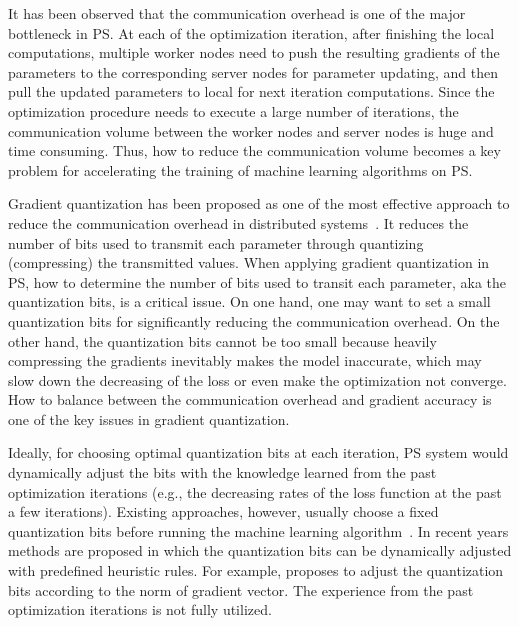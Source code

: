 \documentclass[sigconf]{acmart}
\begin{document}
It has been observed that the communication overhead is one of the major bottleneck in PS\cite{dean2012large,ho2013more}. At each of the optimization iteration, after finishing the local computations, multiple worker nodes need to push the resulting gradients of the parameters to the corresponding server nodes for parameter updating, and then pull the updated parameters to local for next iteration computations. Since the optimization procedure needs to execute a large number of iterations, the communication volume between the worker nodes and server nodes is huge and time consuming. Thus, how to reduce the communication volume becomes a key problem for accelerating the training of machine learning algorithms on PS.


Gradient quantization has been proposed as one of the most effective approach to reduce the communication overhead in distributed systems~\cite{oland2015reducing,seide20141,alistarh2016qsgd}. It reduces the number of bits used to transmit each parameter through quantizing (compressing) the transmitted values. When applying gradient quantization in PS, how to determine the number of bits used to transit each parameter, aka the quantization bits, is a critical issue. On one hand, one may want to set a small quantization bits for significantly reducing the communication overhead. On the other hand, the quantization bits cannot be too small because heavily compressing the gradients inevitably makes the model inaccurate, which may slow down the decreasing of the loss or even make the optimization not converge. How to balance between the communication overhead and gradient accuracy is one of the key issues in gradient quantization.

Ideally, for choosing optimal quantization bits at each iteration,  PS system would dynamically adjust the bits with the knowledge learned from the past optimization iterations (e.g., the decreasing rates of the loss function at the past a few iterations). Existing approaches, however, usually choose a fixed  quantization bits before running the machine learning algorithm~\cite{seide20141,alistarh2016qsgd}. In recent years methods are proposed in which the quantization bits can be dynamically adjusted with predefined heuristic rules. For example, \citeauthor{oland2015reducing} proposes to adjust the quantization bits according to the norm of gradient vector\cite{oland2015reducing}. The experience from the past optimization iterations is not fully utilized.
\end{document}
